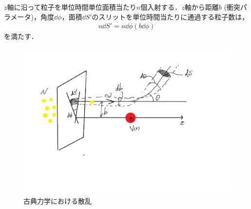 \documentclass{report}
\begin{document}
  $z$軸に沿って粒子を単位時間単位面積当たり$n$個入射する．$z$軸から距離$b$ (衝突パラメータ)，角度$\dd{\phi}$，面積$\dd{S'}$のスリットを単位時間当たりに通過する粒子数は，
  \begin{align}
    n\dd{S'} = n \dd{\phi} (b \dd{\phi})
  \end{align}
  を満たす．
  
  \begin{figure}[H]
    \centering
    \includegraphics[width=0.7\columnwidth]{fig/scattering_cm.pdf}
    \caption{古典力学における散乱}
    \label{sc-in-cm-image}
  \end{figure}
\end{document}
